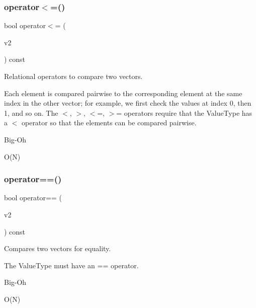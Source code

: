 \subsubsection{\texorpdfstring{operator$<$=()}{operator<=()}}
{\footnotesize\ttfamily bool operator$<$= (\begin{DoxyParamCaption}\item[{const \mbox{\hyperlink{classVector}{Vector}}$<$ Value\+Type $>$ \&}]{v2 }\end{DoxyParamCaption}) const}



Relational operators to compare two vectors. 

Each element is compared pairwise to the corresponding element at the same index in the other vector; for example, we first check the values at index 0, then 1, and so on. The $<$, $>$, $<$=, $>$= operators require that the Value\+Type has a $<$ operator so that the elements can be compared pairwise. \begin{DoxyRefDesc}{Big-\/\+Oh}
\item[\mbox{\hyperlink{BigOh__BigOh000144}{Big-\/\+Oh}}]O(\+N) \end{DoxyRefDesc}
\mbox{\label{classVector_a31eebc4de791cf62b8fa12a0eeca90dc}} 
\subsubsection{\texorpdfstring{operator==()}{operator==()}}
{\footnotesize\ttfamily bool operator== (\begin{DoxyParamCaption}\item[{const \mbox{\hyperlink{classVector}{Vector}}$<$ Value\+Type $>$ \&}]{v2 }\end{DoxyParamCaption}) const}



Compares two vectors for equality. 

The Value\+Type must have an == operator. \begin{DoxyRefDesc}{Big-\/\+Oh}
\item[\mbox{\hyperlink{BigOh__BigOh000141}{Big-\/\+Oh}}]O(\+N) \end{DoxyRefDesc}
\mbox{\label{classVector_a0b8b14442cb420ffaecc0606345e73a1}} 
